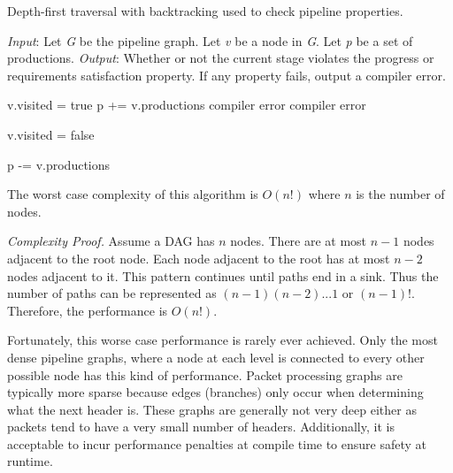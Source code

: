 \begin{algorithm}[ht]
 \caption{Depth-first traversal with backtracking used to check pipeline properties.}
 \label{alg:dfs}
 \begin{algorithmic}
 \State
 \State \textit{Input}: Let \textit{G} be the pipeline graph. Let \textit{v} be a node in \textit{G}. Let \textit{p} be a set of productions.
 \State \textit{Output}: Whether or not the current stage violates the progress or requirements satisfaction property. If any property fails, output a compiler error.
 \State

 	\State v.visited = true
 	\State p  += v.productions
 				\State {}
 			\Else
 				\State \Return compiler error
 			\EndIf
 		\EndFor
	\Else
 		\State \Return compiler error
 	\EndIf
 	
	
 	\State v.visited = false 

 	\State p -= v.productions 
 \EndFunction
 \end{algorithmic}

\end{algorithm}

The worst case complexity of this algorithm is $O(n!)$ where $n$ is the number of nodes.

\textit{Complexity Proof.} Assume a DAG has $n$ nodes. There are at most $n-1$ nodes adjacent to the root node. Each node adjacent to the root has at most $n-2$ nodes adjacent to it. This pattern continues until paths end in a sink. Thus the number of paths can be represented as $(n-1)(n-2)...1$ or $(n-1)!$. Therefore, the performance
is $O(n!)$.

Fortunately, this worse case performance is rarely ever achieved. Only the most dense pipeline graphs, where a node at each level is connected to every other possible node has this kind of performance. Packet processing graphs are typically more sparse because edges (branches) only occur when determining what the next header is. These graphs are generally not very deep either as packets tend to have a very small number of headers.
Additionally, it is acceptable to incur performance penalties at compile time
to ensure safety at runtime.

